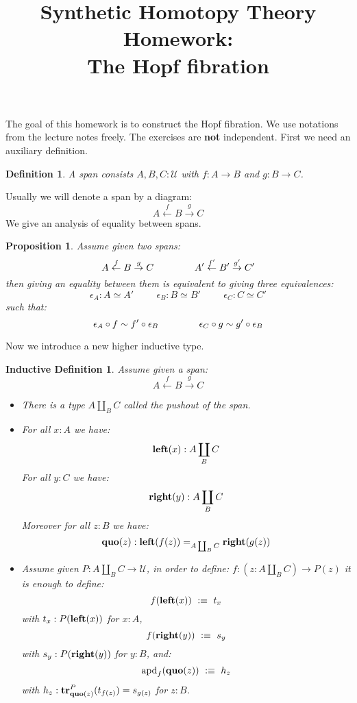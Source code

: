 \documentclass{article}[6pt]%
\title{Synthetic Homotopy Theory Homework: \\ The Hopf fibration}
\newcommand{\U}{{\mathcal U}}
\renewcommand{\r}{\rightarrow}
\newcommand{\apd}{\mathrm{apd}}
\newcommand{\tr}{\mathrm{\bf tr}}
\newtheorem{definition}{Definition}
\newtheorem{proposition}{Proposition}
\newtheorem{ind_def}{Inductive Definition}
\newcommand{\lef}{\mathrm{\bf left}}
\newcommand{\righ}{\mathrm{\bf right}}
\newcommand{\quo}{\mathrm{\bf quo}}
\begin{document}
\maketitle



The goal of this homework is to construct the Hopf fibration. We use notations from the lecture notes freely. The exercises are {\bf not} independent. First we need an auxiliary definition.

\begin{definition}
A span consists $A,B,C:\U$ with $f:A\r B$ and $g:B\r C$.
\end{definition}

Usually we will denote a span by a diagram:
\[A \overset{f}{\leftarrow} B \overset{g}{\r} C\]
We give an analysis of equality between spans.

\begin{proposition}
Assume given two spans:
\[A \overset{f}{\leftarrow} B \overset{g}{\r} C \hspace{1.5cm} A' \overset{f'}{\leftarrow} B' \overset{g'}{\r} C'\]
then giving an equality between them is equivalent to giving three equivalences:
\[\epsilon_A : A \simeq A'  \hspace{1cm} \epsilon_B : B \simeq B'  \hspace{1cm} \epsilon_C : C \simeq C'\]
such that:
\[\epsilon_A \circ f \sim f'\circ \epsilon_B \hspace{1.5cm} \epsilon_C \circ g \sim g'\circ \epsilon_B\]

\end{proposition}

Now we introduce a new higher inductive type.

\begin{ind_def}
Assume given a span: 
\[A \overset{f}{\leftarrow} B \overset{g}{\r} C\]
\begin{itemize}
\item There is a type $A\coprod_B C$ called the pushout of the span.
\item For all $x:A$ we have:
\[\lef(x) : A\coprod_BC\] 
For all $y:C$ we have: 
\[\righ(y) : A\coprod_BC\] 
Moreover for all $z:B$ we have:
\[\quo(z) : \lef(f(z)) =_{A\coprod_BC} \righ(g(z))\]
\item Assume given $P : A\coprod_BC \r \U$, in order to define:
$f : (z:A\coprod_BC) \r P(z)$
it is enough to define:
\[f(\lef(x))\ :\equiv\ t_x\] 
with $t_x:P(\lef(x))$ for $x:A$, 
\[f(\righ(y))\ :\equiv\ s_y\] 
with $s_y:P(\righ(y))$ for $y:B$, and:
\[\apd_f(\quo(z)) \ :\equiv\  h_z\]
with $h_z : \tr^P_{\quo(z)} (t_{f(z)}) = s_{g(z)} $ for $z:B$.
\end{itemize}
\end{ind_def}
\end{document}
